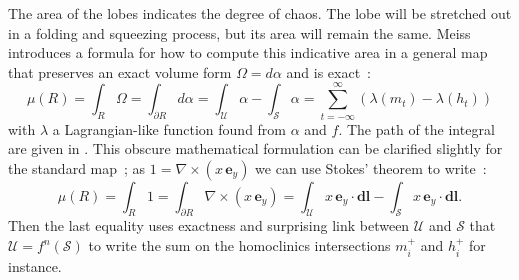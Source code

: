 The area of the lobes indicates the degree of chaos. The lobe will be stretched out in a folding and squeezing process, but its area will remain the same. Meiss introduces a formula for how to compute this indicative area in a general map that preserves an exact volume form $\Omega = d\alpha$ and is exact~:
\begin{equation}
    \mu(R) = \int_R \Omega = \int_{\partial R} d\alpha =  \int_{\mathcal{U}} \alpha - \int_{\mathcal{S}} \alpha = \sum\limits_{t = -\infty}^{\infty}(\lambda(m_t) - \lambda(h_t))
\end{equation}
with $\lambda$ a Lagrangian-like function found from $\alpha$ and $f$. The path of the integral are given in . This obscure mathematical formulation can be clarified slightly for the standard map~; as $1 = \nabla\times (x\,\textbf{e}_y)$ we can use Stokes' theorem to write~:
\begin{equation}
    \mu(R) = \int_R 1 = \int_{\partial R} \nabla\times (x\,\textbf{e}_y) =  \int_{\mathcal{U}} x\,\textbf{e}_y\cdot\textbf{dl} - \int_{\mathcal{S}} x\,\textbf{e}_y\cdot\textbf{dl}.
\end{equation}
Then the last equality uses exactness and surprising link between $\mathcal{U}$ and $\mathcal{S}$ that $\mathcal{U} = f^n(\mathcal{S})$ to write the sum on the homoclinics intersections $m_i^+$ and $h_i^+$ for instance.


